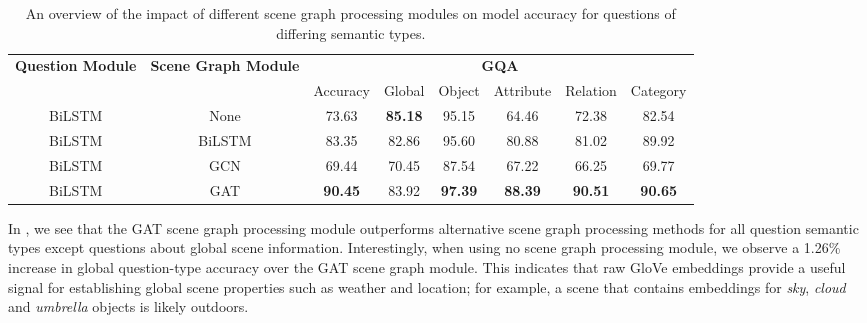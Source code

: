 \begin{table}[htbp]
\centering
\begin{footnotesize}
\begin{tabular}{cc|c|ccccc}
\toprule
\multirow{3}{0.1\textwidth}{\textbf{Question Module}} & \multirow{3}{0.1\textwidth}{\textbf{Scene Graph Module}} & \multicolumn{6}{c}{\multirow{2}{*}{\textbf{GQA}}}                                                   \\
                                          &                                              & \multicolumn{6}{c}{}                                                                                \\ \cmidrule(l){3-8} 
                                          &                                              & Accuracy       & Global         & Object         & Attribute      & Relation       & Category       \\ \midrule
BiLSTM                                    & None                                         & 73.63          & \textbf{85.18} & 95.15          & 64.46          & 72.38          & 82.54          \\
BiLSTM                                    & BiLSTM                                       & 83.35          & 82.86          & 95.60          & 80.88          & 81.02          & 89.92          \\
BiLSTM                                    & GCN                                          & 69.44          & 70.45          & 87.54          & 67.22          & 66.25          & 69.77          \\
\midrule
BiLSTM                                    & GAT                                          & \textbf{90.45} & 83.92          & \textbf{97.39} & \textbf{88.39}          & \textbf{90.51} & \textbf{90.65} \\
\bottomrule
\end{tabular}
\end{footnotesize}
\caption[Scene graph processing module ablation performance for questions of differing semantic types.]{An overview of the impact of different scene graph processing modules on model accuracy for questions of differing semantic types.}
\label{table:scene_graph_ablation_semantic}
\end{table}

In \tableautorefname{ \ref{table:scene_graph_ablation_semantic}}, we see that the GAT scene graph processing module outperforms alternative scene graph processing methods for all question semantic types except questions about global scene information. Interestingly, when using no scene graph processing module, we observe a 1.26\% increase in global question-type accuracy over the GAT scene graph module. This indicates that raw GloVe embeddings provide a useful signal for establishing global scene properties such as weather and location; for example, a scene that contains embeddings for \textit{sky}, \textit{cloud} and \textit{umbrella} objects is likely outdoors.

